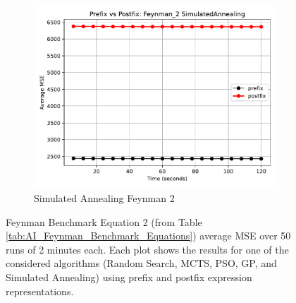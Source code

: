 \documentclass[12pt]{iopart}
\begin{document}
\begin{figure}
    \vspace{0.5cm}
    
    \begin{subfigure}[b]{0.4\textwidth}
        \includegraphics[width=\linewidth, keepaspectratio]{AIFeynman_Benchmarks/PrePostFeynman_2SimulatedAnnealing.pdf}
        \caption{Simulated Annealing Feynman 2}
        \label{subfig:feynman_2_SA}
    \end{subfigure}
    
    \caption{Feynman Benchmark Equation 2 (from Table \ref{tab:AI_Feynman_Benchmark_Equations}) average MSE over 50 runs of 2 minutes each. Each plot shows the results for one of the considered algorithms (Random Search, MCTS, PSO, GP, and Simulated Annealing) using prefix and postfix expression representations.}
    \label{fig:AIFeynman_2_Benchmarks}
\end{figure}
\end{document}
